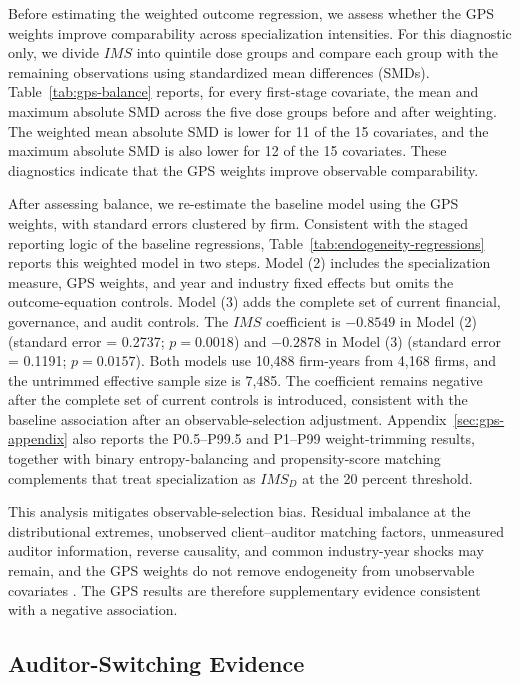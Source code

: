 \documentclass[11pt]{article}
\begin{document}
Before estimating the weighted outcome regression, we assess whether the GPS weights improve comparability across specialization intensities.
For this diagnostic only, we divide \(IMS\) into quintile dose groups and compare each group with the remaining observations using standardized mean differences (SMDs).
Table~\ref{tab:gps-balance} reports, for every first-stage covariate, the mean and maximum absolute SMD across the five dose groups before and after weighting.
The weighted mean absolute SMD is lower for 11 of the 15 covariates, and the maximum absolute SMD is also lower for 12 of the 15 covariates.
These diagnostics indicate that the GPS weights improve observable comparability.

After assessing balance, we re-estimate the baseline model using the GPS weights, with standard errors clustered by firm.
Consistent with the staged reporting logic of the baseline regressions, Table~\ref{tab:endogeneity-regressions} reports this weighted model in two steps.
Model (2) includes the specialization measure, GPS weights, and year and industry fixed effects but omits the outcome-equation controls.
Model (3) adds the complete set of current financial, governance, and audit controls.
The \(IMS\) coefficient is \(-0.8549\) in Model (2) (standard error = 0.2737; \(p=0.0018\)) and \(-0.2878\) in Model (3) (standard error = 0.1191; \(p=0.0157\)).
Both models use 10,488 firm-years from 4,168 firms, and the untrimmed effective sample size is 7,485.
The coefficient remains negative after the complete set of current controls is introduced, consistent with the baseline association after an observable-selection adjustment.
Appendix~\ref{sec:gps-appendix} also reports the P0.5--P99.5 and P1--P99 weight-trimming results, together with binary entropy-balancing and propensity-score matching complements that treat specialization as \(IMS_D\) at the 20 percent threshold.

This analysis mitigates observable-selection bias.
Residual imbalance at the distributional extremes, unobserved client--auditor matching factors, unmeasured auditor information, reverse causality, and common industry-year shocks may remain, and the GPS weights do not remove endogeneity from unobservable covariates \citep{brick2024internal}.
The GPS results are therefore supplementary evidence consistent with a negative association.


\subsection{Auditor-Switching Evidence}
\end{document}
